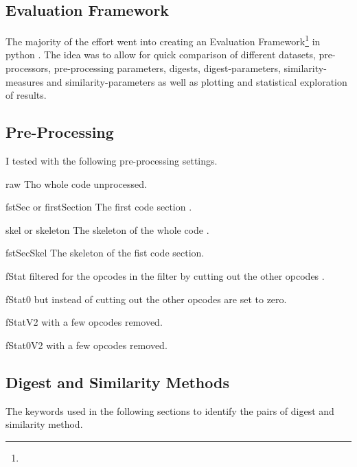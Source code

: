 \documentclass[../main.tex]{subfiles}
\begin{document}
\subsection{Evaluation Framework}
The majority of the effort went into creating an Evaluation Framework\footnote{} in python \cite{ethereum-contract-similarity}.
The idea was to allow for quick comparison of different datasets, pre-processors, pre-processing parameters, digests, digest-parameters, similarity-measures and similarity-parameters as well as plotting and statistical exploration of results.

\subsection{Pre-Processing}
I tested with the following pre-processing settings.

\begin{desc}
  \item[raw] Tho whole code unprocessed.
  \item[fstSec or firstSection] The first code section .
  \item[skel or skeleton] The skeleton of the whole code .
  \item[fstSecSkel] The skeleton of the fist code section.
  \item[fStat]  filtered for the opcodes in the  filter by cutting out the other opcodes .
  \item[fStat0]  but instead of cutting out the other opcodes are set to zero.
  \item[fStatV2]  with a few opcodes removed.
  \item[fStat0V2]  with a few opcodes removed.
\end{desc}

\subsection{Digest and Similarity Methods}
The keywords used in the following sections to identify the pairs of digest and similarity method.
\end{document}
